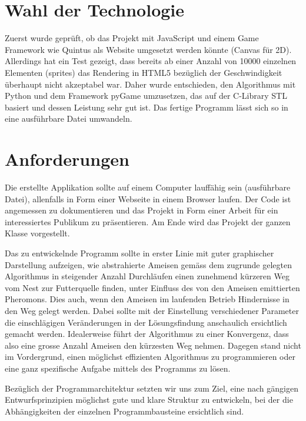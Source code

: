 \newpage

\section{Wahl der Technologie}

Zuerst wurde geprüft, ob das Projekt mit JavaScript und einem Game Framework wie
Quintus als Website umgesetzt werden könnte (Canvas für 2D). Allerdings hat ein
Test gezeigt, dass bereits ab einer Anzahl von \num{10000} einzelnen Elementen
(sprites) das Rendering in HTML5 bezüglich der Geschwindigkeit überhaupt nicht
akzeptabel war. Daher wurde entschieden, den Algorithmus mit Python und dem
Framework pyGame umzusetzen, das auf der C-Library STL basiert und dessen
Leistung sehr gut ist. Das fertige Programm lässt sich so in eine ausführbare
Datei umwandeln.

\section{Anforderungen}

Die erstellte Applikation sollte auf einem Computer lauffähig sein (ausführbare
Datei), allenfalls in Form einer Webseite in einem Browser laufen. Der Code ist
angemessen zu dokumentieren und das Projekt in Form einer Arbeit für ein
interessiertes Publikum zu präsentieren. Am Ende wird das Projekt der ganzen
Klasse vorgestellt.

Das zu entwickelnde Programm sollte in erster Linie mit guter graphischer
Darstellung aufzeigen, wie abstrahierte Ameisen gemäss dem zugrunde gelegten
Algorithmus in steigender Anzahl Durchläufen einen zunehmend kürzeren Weg vom
Nest zur Futterquelle finden, unter Einfluss des von den Ameisen emittierten
Pheromons. Dies auch, wenn den Ameisen im laufenden Betrieb Hindernisse in den
Weg gelegt werden. Dabei sollte mit der Einstellung verschiedener Parameter die
einschlägigen Veränderungen in der Lösungsfindung anschaulich ersichtlich gemacht
werden. Idealerweise führt der Algorithmus zu einer Konvergenz, dass also eine
grosse Anzahl Ameisen den kürzesten Weg nehmen. Dagegen stand nicht im
Vordergrund, einen möglichst effizienten Algorithmus zu programmieren oder eine
ganz spezifische Aufgabe mittels des Programms zu lösen.

Bezüglich der Programmarchitektur setzten wir uns zum Ziel, eine nach gängigen
Entwurfsprinzipien möglichst gute und klare Struktur zu entwickeln, bei der die
Abhängigkeiten der einzelnen Programmbausteine ersichtlich sind.


